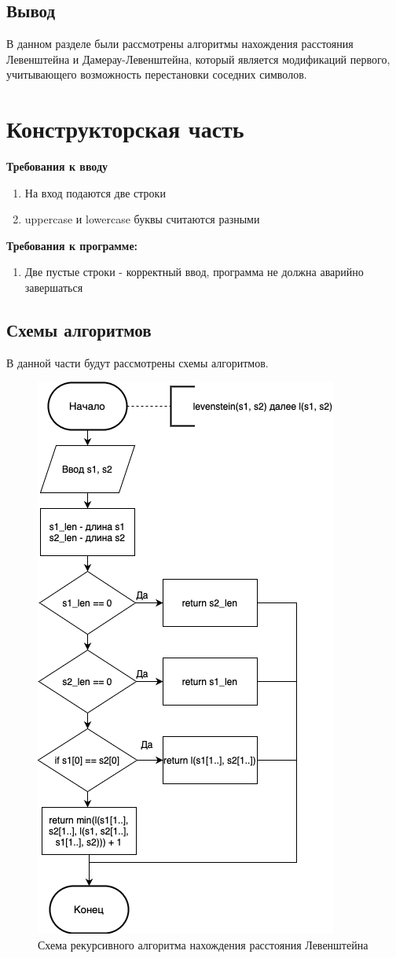 \documentclass[12pt]{report}
\begin{document}
\section{Вывод}
В данном разделе были рассмотрены алгоритмы нахождения расстояния Левенштейна и Дамерау-Левенштейна, который является модификаций первого, учитывающего возможность перестановки соседних символов. 
		
\chapter{Конструкторская часть}
\textbf{Требования к вводу}
		
\begin{enumerate}
	\item На вход подаются две строки
	\item uppercase и lowercase буквы считаются разными
\end{enumerate}
		
\textbf{Требования к программе:}

\begin{enumerate}
	\item Две пустые строки - корректный ввод, программа не должна аварийно завершаться
\end{enumerate}

\section{Схемы алгоритмов}
В данной части будут рассмотрены схемы алгоритмов.

\begin{figure}[h]
	\centering
	\includegraphics[width=0.5\linewidth]{lev_rec.png}
	\caption{Схема рекурсивного алгоритма нахождения расстояния Левенштейна}
	\label{fig:mpr}
\end{figure}
\end{document}
